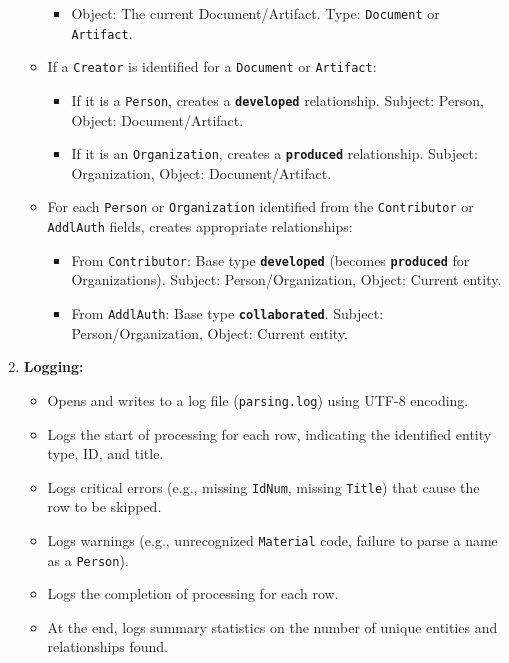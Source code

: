 \begin{enumerate}
\begin{itemize}
\begin{itemize}
                    \item Object: The current Document/Artifact. Type: \texttt{Document} or \texttt{Artifact}.
                \end{itemize}
            \item If a \texttt{Creator} is identified for a \texttt{Document} or \texttt{Artifact}:
                \begin{itemize}
                    \item If it is a \texttt{Person}, creates a \textbf{\texttt{developed}} relationship. Subject: Person, Object: Document/Artifact.
                    \item If it is an \texttt{Organization}, creates a \textbf{\texttt{produced}} relationship. Subject: Organization, Object: Document/Artifact.
                \end{itemize}
            \item For each \texttt{Person} or \texttt{Organization} identified from the \texttt{Contributor} or \texttt{AddlAuth} fields, creates appropriate relationships:
                \begin{itemize}
                    \item From \texttt{Contributor}: Base type \textbf{\texttt{developed}} (becomes \textbf{\texttt{produced}} for Organizations). Subject: Person/Organization, Object: Current entity.
                    \item From \texttt{AddlAuth}: Base type \textbf{\texttt{collaborated}}. Subject: Person/Organization, Object: Current entity.
                \end{itemize}
        \end{itemize}

    \item \textbf{Logging:}
        \begin{itemize}
            \item Opens and writes to a log file (\texttt{parsing.log}) using UTF-8 encoding.
            \item Logs the start of processing for each row, indicating the identified entity type, ID, and title.
            \item Logs critical errors (e.g., missing \texttt{IdNum}, missing \texttt{Title}) that cause the row to be skipped.
            \item Logs warnings (e.g., unrecognized \texttt{Material} code, failure to parse a name as a \texttt{Person}).
            \item Logs the completion of processing for each row.
            \item At the end, logs summary statistics on the number of unique entities and relationships found.
        \end{itemize}


\end{enumerate}
